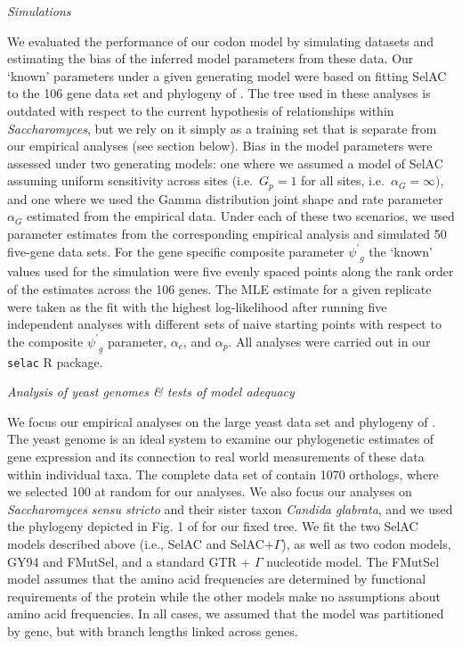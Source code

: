 \documentclass[12pt,letterpaper,fleqn]{article}
\renewcommand{\subsection}[1]{%
\bigskip
\begin{center}
\begin{large}
\normalfont\itshape #1
\end{large}
\end{center}}
\newcommand{\selac}{SelAC\xspace}
\newcommand{\selacplusgamma}{SelAC$+\Gamma$\xspace}
\newcommand{\alphac}{\ensuremath{\alpha_c}\xspace}
\newcommand{\alphag}{\ensuremath{\alpha_G}\xspace}
\newcommand{\alphap}{\ensuremath{\alpha_p}\xspace}
\newcommand{\psiprime}{\ensuremath{\psi^\prime}\xspace}
\newcommand{\gp}{\ensuremath{{G_p}}\xspace}
\begin{document}
\subsection{Simulations}
We evaluated the performance of our codon model by simulating datasets and estimating the bias of the inferred model parameters from these data.
Our `known' parameters under a given generating model were based on fitting SelAC to the 106 gene data set and phylogeny of \citet{RokasEtAl2003}.
The tree used in these analyses is outdated with respect to the current hypothesis of relationships within \emph{Saccharomyces}, but we rely on it simply as a training set that is separate from our empirical analyses (see section below).
Bias in the model parameters were assessed under two generating models: one where we assumed a model of SelAC assuming uniform sensitivity across sites (i.e.~$\gp = 1$ for all sites, i.e.~$\alphag = \infty)$, and one where we used the Gamma distribution joint shape and rate parameter $\alphag$ estimated from the empirical data.
Under each of these two scenarios, we used parameter estimates from the corresponding empirical analysis and simulated 50 five-gene data sets.
For the gene specific composite parameter $\psiprime_g$ the `known' values used for the simulation were five evenly spaced points along the rank order of the estimates across the 106 genes.
The MLE estimate for a given replicate were taken as the fit with the highest log-likelihood after running five independent analyses with different sets of naive starting points with respect to the composite $\psiprime_g$ parameter, $\alphac$, and $\alphap$.
All analyses were carried out in our \texttt{selac} R package.

\subsection{Analysis of yeast genomes \& tests of model adequacy} \label{sec:analysis}
We focus our empirical analyses on the large yeast data set and phylogeny of \citet{SalichosAndRokas2013}.
The yeast genome is an ideal system to examine our phylogenetic estimates of gene expression and its connection to real world measurements of these data within individual taxa.
The complete data set of \citet{SalichosAndRokas2013} contain 1070 orthologs, where we selected 100 at random for our analyses.
We also focus our analyses on \emph{Saccharomyces} \emph{sensu stricto} and their sister taxon \emph{Candida glabrata}, and we used the phylogeny depicted in Fig. 1 of \citet{SalichosAndRokas2013} for our fixed tree.
We fit the two \selac models described above (i.e., \selac and \selacplusgamma), as well as two codon models, GY94 and FMutSel, and a standard GTR + $\Gamma$ nucleotide model.
The FMutSel model assumes that the amino acid frequencies are determined by functional requirements of the protein while the other models make no assumptions about amino acid frequencies.
In all cases, we assumed that the model was partitioned by gene, but with branch lengths linked across genes.
\end{document}
